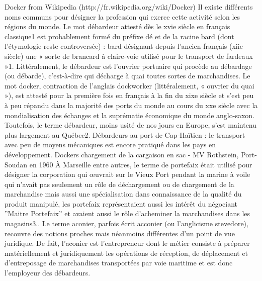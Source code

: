 \documentclass{42}
\begin{document}
Docker from Wikipedia (http://fr.wikipedia.org/wiki/Docker)
\newline
\newline
Il existe différents noms communs pour désigner la profession qui exerce cette activité selon les régions du monde.
\newline
\newline
Le mot débardeur attesté dès le xvie siècle en français classique1 est probablement formé du préfixe dé et de la racine bard (dont l'étymologie reste controversée) : bard désignant depuis l'ancien français (xiie siècle) une « sorte de brancard à claire-voie utilisé pour le transport de fardeaux »1. Littéralement, le débardeur est l'ouvrier portuaire qui procède au débardage (ou débarde), c'est-à-dire qui décharge à quai toutes sortes de marchandises.
\newline
\newline
Le mot docker, contraction de l'anglais dockworker (littéralement, « ouvrier du quai »), est attesté pour la première fois en français à la fin du xixe siècle et s'est peu à peu répandu dans la majorité des ports du monde au cours du xxe siècle avec la mondialisation des échanges et la suprématie économique du monde anglo-saxon. Toutefois, le terme débardeur, moins usité de nos jours en Europe, s'est maintenu plus largement au Québec2.
\newline
\newline
Débardeurs au port de Cap-Haïtien : le transport avec peu de moyens mécaniques est encore pratiqué dans les pays en développement.
\newline
\newline
Dockers chargement de la cargaison en sac - MV Rothstein, Port-Soudan en 1960
À Marseille entre autres, le terme de portefaix était utilisé pour désigner la corporation qui œuvrait sur le Vieux Port pendant la marine à voile qui n'avait pas seulement un rôle de déchargement ou de chargement de la marchandise mais aussi une spécialisation dans connaissance de la qualité du produit manipulé, les portefaix représentaient aussi les intérêt du négociant ''Maitre Portefaix'' et avaient aussi le rôle d'acheminer la marchandises dans les magasins3..
\newline
\newline
Le terme aconier, parfois écrit acconier (ou l'anglicisme stevedore), recouvre des notions proches mais néanmoins différentes d'un point de vue juridique. De fait, l'aconier est l'entrepreneur dont le métier consiste à préparer matériellement et juridiquement les opérations de réception, de déplacement et d’entreposage de marchandises transportées par voie maritime et est donc l'employeur des débardeurs.
\end{document}

